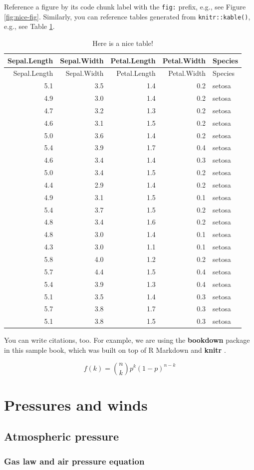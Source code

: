 \documentclass[oneside]{book}
\begin{document}
Reference a figure by its code chunk label with the \texttt{fig:}
prefix, e.g., see Figure \ref{fig:nice-fig}. Similarly, you can
reference tables generated from \texttt{knitr::kable()}, e.g., see Table
\ref{tab:nice-tab}.

\begin{longtable}[]{@{}rrrrl@{}}
\caption{\label{tab:nice-tab}Here is a nice table!}\tabularnewline
\toprule
Sepal.Length & Sepal.Width & Petal.Length & Petal.Width &
Species\tabularnewline
\midrule
\endfirsthead
\toprule
Sepal.Length & Sepal.Width & Petal.Length & Petal.Width &
Species\tabularnewline
\midrule
\endhead
5.1 & 3.5 & 1.4 & 0.2 & setosa\tabularnewline
4.9 & 3.0 & 1.4 & 0.2 & setosa\tabularnewline
4.7 & 3.2 & 1.3 & 0.2 & setosa\tabularnewline
4.6 & 3.1 & 1.5 & 0.2 & setosa\tabularnewline
5.0 & 3.6 & 1.4 & 0.2 & setosa\tabularnewline
5.4 & 3.9 & 1.7 & 0.4 & setosa\tabularnewline
4.6 & 3.4 & 1.4 & 0.3 & setosa\tabularnewline
5.0 & 3.4 & 1.5 & 0.2 & setosa\tabularnewline
4.4 & 2.9 & 1.4 & 0.2 & setosa\tabularnewline
4.9 & 3.1 & 1.5 & 0.1 & setosa\tabularnewline
5.4 & 3.7 & 1.5 & 0.2 & setosa\tabularnewline
4.8 & 3.4 & 1.6 & 0.2 & setosa\tabularnewline
4.8 & 3.0 & 1.4 & 0.1 & setosa\tabularnewline
4.3 & 3.0 & 1.1 & 0.1 & setosa\tabularnewline
5.8 & 4.0 & 1.2 & 0.2 & setosa\tabularnewline
5.7 & 4.4 & 1.5 & 0.4 & setosa\tabularnewline
5.4 & 3.9 & 1.3 & 0.4 & setosa\tabularnewline
5.1 & 3.5 & 1.4 & 0.3 & setosa\tabularnewline
5.7 & 3.8 & 1.7 & 0.3 & setosa\tabularnewline
5.1 & 3.8 & 1.5 & 0.3 & setosa\tabularnewline
\bottomrule
\end{longtable}

You can write citations, too. For example, we are using the
\textbf{bookdown} package \citep{R-bookdown} in this sample book, which
was built on top of R Markdown and \textbf{knitr} \citep{xie2015}.

\[
  f\left(k\right) = \binom{n}{k} p^k\left(1-p\right)^{n-k}
\]

\chapter{Pressures and winds}\label{pressures-and-winds}


\section{Atmospheric pressure}\label{atmospheric-pressure}

\subsection{Gas law and air pressure
equation}\label{gas-law-and-air-pressure-equation}
\end{document}

